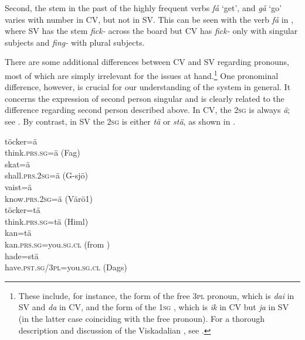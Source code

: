\documentclass[output=paper,colorlinks,citecolor=brown,draft,draftmode]{langscibook}
\begin{document}
Second, the stem in the past  of the highly frequent verbs \textit{få} ‘get’, and \textit{gå} ‘go’ varies with number in CV, but not in SV. This can be seen with the verb \textit{få} in , where SV has the stem \textit{fick-} across the board but CV has \textit{fick-} only with singular subjects and \textit{fing-} with plural subjects.



There are some additional differences between CV and SV regarding pronouns, most of which are simply irrelevant for the issues at hand.\footnote{These include, for instance, the form of the free 3\textsc{pl} pronoun, which is \textit{dai} in SV and \textit{da} in CV, and the form of the 1\textsc{sg} , which is \textit{ik} in CV but \textit{ja} in SV (in the latter case coinciding with the free pronoun). For a thorough description and discussion of the Viskadalian , see \citet{Petzell2017}.} One pronominal difference, however, is crucial for our understanding of the  system in general. It concerns the expression of second person singular and is clearly related to the difference regarding second person  described above. In CV, the 2\textsc{sg}  is always \textit{ä}; see . By contrast, in SV the 2\textsc{sg}  is either \textit{tä} or \textit{stä}, as shown in .


\ea\label{ex:petzell:19}
\ea\label{ex:petzell:19a}
\gll töcker=ä \\
    think.\textsc{prs.sg=}ä (Fag)    \\
\ex\label{ex:petzell:19b}
\gll skat=ä   \\
    shall.\textsc{prs}.2\textsc{sg}=ä (G-sjö)  \\
\ex\label{ex:petzell:19c}
\gll vaist=ä   \\
    know.\textsc{prs}.2\textsc{sg}=ä (Värö1)\\
\z
\ex\label{ex:petzell:20}
\ea\label{ex:petzell:20a}
\gll töcker=tä \\
    think.\textsc{prs.sg}=tä (Himl)  \\
\ex\label{ex:petzell:20b}
\gll kan=tä   \\
    kan.\textsc{prs.sg}=you.\textsc{sg}.\textsc{cl} (from \citealt{Andersson1922})  \\
\ex\label{ex:petzell:20c}
\gll hade=stä   \\
    have.\textsc{pst}.\textsc{sg}/3\textsc{pl}=you.\textsc{sg}.\textsc{cl} (Dags)\\
\z
\z
\end{document}
